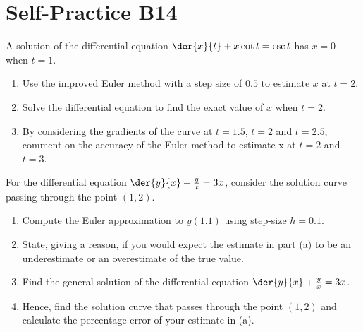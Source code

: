 \section{Self-Practice B14}

\begin{problem}
    A solution of the differential equation $\der{x}{t} + x \cot t = \csc t$ has $x = 0$ when $t = 1$.
    \begin{enumerate}
        \item Use the improved Euler method with a step size of $0.5$ to estimate $x$ at $t = 2$.
        \item Solve the differential equation to find the exact value of $x$ when $t = 2$.
        \item By considering the gradients of the curve at $t = 1.5$, $t = 2$ and $t = 2.5$, comment
        on the accuracy of the Euler method to estimate x at $t = 2$ and $t = 3$.
    \end{enumerate}
\end{problem}

\begin{problem}
    For the differential equation $\der{y}{x} + \frac{y}{x} = 3x$, consider the solution curve passing through the point $(1, 2)$.
    \begin{enumerate}
        \item Compute the Euler approximation to $y(1.1)$ using step-size $h = 0.1$.
        \item State, giving a reason, if you would expect the estimate in part (a) to be an underestimate or an overestimate of the true value.
        \item Find the general solution of the differential equation $\der{y}{x} + \frac{y}{x} = 3x$.
        \item Hence, find the solution curve that passes through the point $(1, 2)$ and calculate
        the percentage error of your estimate in (a).
    \end{enumerate}
\end{problem}


